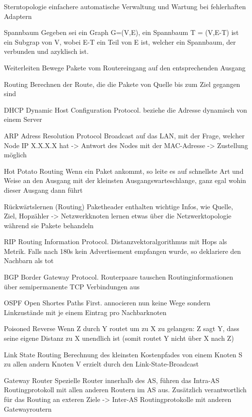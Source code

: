 \documentclass[10pt,landscape]{article}
\begin{document}
\begin{multicols}{3}
\begin{description*}
        \item[Sterntopologie] einfachere automatische Verwaltung und Wartung bei fehlerhaften Adaptern
        \item[Spannbaum] Gegeben sei ein Graph G=(V,E), ein Spannbaum T = (V,E-T) ist ein Subgrap von V, wobei E-T ein Teil von E ist, welcher ein Spannbaum, der verbunden und azyklisch ist.
        \item[Weiterleiten] Bewege Pakete vom Routereingang auf den entsprechenden Ausgang
        \item[Routing] Berechnen der Route, die die Pakete von Quelle bis zum Ziel gegangen sind
        \item[DHCP] Dynamic Host Configuration Protocol. beziehe die Adresse dynamisch von einem Server
        \item[ARP] Adress Resolution Protocol Broadcast auf das LAN, mit der Frage, welcher Node IP X.X.X.X hat -> Antwort des Nodes mit der MAC-Adresse -> Zustellung möglich
        \item[Hot Potato Routing] Wenn ein Paket ankommt, so leite es auf schnellste Art und Weise an den Ausgang mit der kleinsten Ausgangswarteschlange, ganz egal wohin dieser Ausgang dann führt
        \item[Rückwärtslernen (Routing)] Paketheader enthalten wichtige Infos, wie Quelle, Ziel, Hopzähler -> Netzwerkknoten lernen etwas über die Netzwerktopologie während sie Pakete behandeln
        \item[RIP] Routing Information Protocol. Distanzvektoralgorithmus mit Hops als Metrik. Falls nach 180s kein Advertisement empfangen wurde, so deklariere den Nachbarn als tot
        \item[BGP] Border Gateway Protocol. Routerpaare tauschen Routinginformationen über semipermanente TCP Verbindungen aus
        \item[OSPF] Open Shortes Paths First. annocieren nun keine Wege sondern Linkzustände mit je einem Eintrag pro Nachbarknoten
        \item[Poisoned Reverse] Wenn Z durch Y routet um zu X zu gelangen: Z sagt Y, dass seine eigene Distanz zu X unendlich ist (somit routet Y nicht über X nach Z)
        \item[Link State Routing] Berechnung des kleinsten Kostenpfades von einem Knoten S zu allen andern Knoten V erzielt durch den Link-State-Broadcast
        \item[Gateway Router] Spezielle Router innerhalb des AS, führen das Intra-AS Routingprotokoll mit allen anderen Routern im AS aus. Zusätzlich verantwortlich für das Routing an exteren Ziele -> Inter-AS Routingprotokolle mit anderen Gatewayroutern

\end{description*}
\end{multicols}
\end{document}
